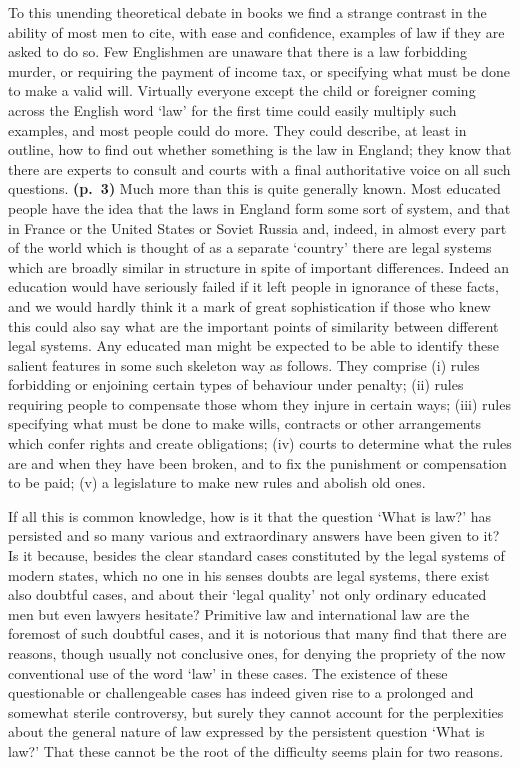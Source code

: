 To this unending theoretical debate in books we find a strange contrast
in the ability of most men to cite, with ease and confidence, examples
of law if they are asked to do so. Few Englishmen are unaware that there
is a law forbidding murder, or requiring the payment of income tax, or
specifying what must be done to make a valid will. Virtually everyone
except the child or foreigner coming across the English word `law' for
the first time could easily multiply such examples, and most people
could do more. They could describe, at least in outline, how to find out
whether something is the law in England; they know that there are
experts to consult and courts with a final authoritative voice on all
such questions. \textbf{(p.~3)} Much more than this is quite generally
known. Most educated people have the idea that the laws in England form
some sort of system, and that in France or the United States or Soviet
Russia and, indeed, in almost every part of the world which is thought
of as a separate `country' there are legal systems which are broadly
similar in structure in spite of important differences. Indeed an
education would have seriously failed if it left people in ignorance of
these facts, and we would hardly think it a mark of great sophistication
if those who knew this could also say what are the important points of
similarity between different legal systems. Any educated man might be
expected to be able to identify these salient features in some such
skeleton way as follows. They comprise (i) rules forbidding or enjoining
certain types of behaviour under penalty; (ii) rules requiring people to
compensate those whom they injure in certain ways; (iii) rules
specifying what must be done to make wills, contracts or other
arrangements which confer rights and create obligations; (iv) courts to
determine what the rules are and when they have been broken, and to fix
the punishment or compensation to be paid; (v) a legislature to make new
rules and abolish old ones.

If all this is common knowledge, how is it that the question `What is
law?' has persisted and so many various and extraordinary answers have
been given to it? Is it because, besides the clear standard cases
constituted by the legal systems of modern states, which no one in his
senses doubts are legal systems, there exist also doubtful cases, and
about their `legal quality' not only ordinary educated men but even
lawyers hesitate? Primitive law and international law are the foremost
of such doubtful cases, and it is notorious that many find that there
are reasons, though usually not conclusive ones, for denying the
propriety of the now conventional use of the word `law' in these cases.
The existence of these questionable or challengeable cases has indeed
given rise to a prolonged and somewhat sterile controversy, but surely
they cannot account for the perplexities about the general nature of law
expressed by the persistent question `What is law?' That these cannot be
the root of the difficulty seems plain for two reasons.

